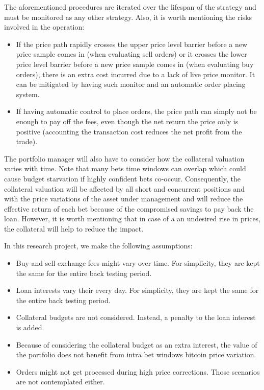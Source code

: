 The aforementioned procedures are iterated over the lifespan of the strategy and
must be monitored as any other strategy. Also, it is worth mentioning the risks
involved in the operation:

\begin{itemize}
  \item If the price path rapidly crosses the upper price level barrier before a 
        new price sample comes in (when evaluating sell orders) or it crosses the lower price
        level barrier before a new price sample comes in (when evaluating buy orders), there is
        an extra cost incurred due to a lack of live price monitor. It can be
        mitigated by having such monitor and an automatic order placing system.
  \item If having automatic control to place orders, the price path can simply
        not be enough to pay off the fees, even though the net return the price only is positive (accounting the transaction cost reduces the net profit from the trade).
\end{itemize}  

The portfolio manager will also have to consider how the collateral valuation
varies with time. Note that many bets time windows can overlap which
could cause budget starvation if highly confident bets co-occur.
Consequently, the collateral valuation will be affected by all short and
concurrent positions and with the price variations of the asset under management
and will reduce the effective return of each bet because of the compromised
savings to pay back the loan. However, it is worth mentioning that in case of a
an undesired rise in prices, the collateral will help to reduce the impact.

In this research project, we make the following assumptions:

\begin{itemize}
  \item Buy and sell exchange fees might vary over time. For simplicity, they
        are kept the same for the entire back testing period.
  \item Loan interests vary their every day. For
        simplicity, they are kept the same for the entire back testing period.
  \item Collateral budgets are not considered. Instead, a penalty to the loan
        interest is added.
  \item Because of considering the collateral budget as an extra interest, the
        value of the portfolio does not benefit from intra bet windows
        bitcoin price variation.
  \item Orders might not get processed during high price corrections. Those
        scenarios are not contemplated either.
\end{itemize}

